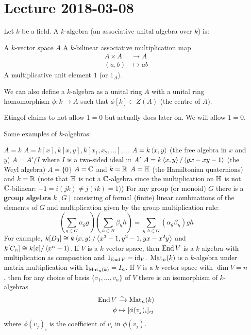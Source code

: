 \section{Lecture 2018-03-08}

\begin{defn}
	Let $k$ be a field.
	A $k$-algebra (an associative unital algebra over $k$) is:
	\begin{itm}
		\io A $k$-vector space $A$
		\io A $k$-bilinear associative multiplication map
			\begin{align*}
				A \times A &\to A \\
				(a,b) &\mapsto ab
			\end{align*}
		\io A multiplicative unit element $1$ (or $1_A$).
	\end{itm}
\end{defn}

\begin{rmk}
	We can also define a $k$-algebra as a unital ring $A$ with a unital ring homomorphism $\phi: k \to A$ such that $\phi[k] \subset Z(A)$ (the centre of $A$).
\end{rmk}

\begin{rmk}
	Etingof claims to not allow $1=0$ but actually does later on.
	We will allow $1=0$.
\end{rmk}

\begin{exam}
	Some examples of $k$-algebras:
	\begin{enum}
		\io $A=k$
		\io $A=k[x],k[x,y],k[x_1,x_2,\ldots],\ldots$
		\io $A=k\left\langle x,y \right\rangle$ (the free algebra in $x$ and $y$)
		\io $A=A'/I$ where $I$ is a two-sided ideal in $A'$
		\io $A=k\left\langle x,y \right\rangle/\left\langle yx-xy-1 \right\rangle$ (the Weyl algebra)
		\io $A=\{0\}$
		\io $A=\mathbb{C}$ and $k=\mathbb{R}$
		\io $A=\mathbb{H}$ (the Hamiltonian quaternions) and $k=\mathbb{R}$ (note that $\mathbb{H}$ is not a $\mathbb{C}$-algebra since the multiplication on $\mathbb{H}$ is not $\mathbb{C}$-bilinear: $-1=i(jk)\neq j(ik)=1$))
		\io For any group (or monoid) $G$ there is a \textbf{group algebra} $k[G]$ consisting of formal (finite) linear combinations of the elements of $G$ and multiplication given by the group multiplication rule:
		\[\left(\sum_{g\in G}\alpha_gg\right)\left(\sum_{h\in H}\beta_hh\right)=\sum_{g,h\in G}(\alpha_g\beta_h)gh\]
		For example, $k[D_3]\cong k\left\langle x,y \right\rangle/\left\langle x^3-1,y^2-1,yx-x^2y \right\rangle$ and $k[C_n]\cong k[x]/\left\langle x^n-1 \right\rangle$.
		\io If $V$ is a $k$-vector space, then $\operatorname{End} V$ is a $k$-algebra with multiplication as composition and $1_{\operatorname{End} V}=\operatorname{id}_V$.
		\io $\operatorname{Mat}_n(k)$ is a $k$-algebra under matrix multiplication with $1_{\operatorname{Mat}_n(k)}=I_n$.
		If $V$ is a $k$-vector space with $\dim V=n$, then for any choice of basis $\{v_1,\ldots,v_n\}$ of $V$ there is an isomorphism of $k$-algebras
		\begin{align*}
			\operatorname{End} V &\xrightarrow{\sim} \operatorname{Mat}_n(k) \\
			\phi &\mapsto [\phi(v_j)_i]_{ij}
		\end{align*}
		where $\phi(v_j)_i$ is the coefficient of $v_i$ in $\phi(v_j)$.
	\end{enum}
\end{exam}


